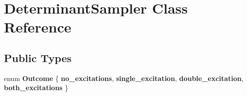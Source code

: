 \hypertarget{classDeterminantSampler}{}\section{Determinant\+Sampler Class Reference}
\label{classDeterminantSampler}
\subsection*{Public Types}
\begin{DoxyCompactItemize}
\item 
enum {\bfseries Outcome} \{ {\bfseries no\+\_\+excitations}, 
{\bfseries single\+\_\+excitation}, 
{\bfseries double\+\_\+excitation}, 
{\bfseries both\+\_\+excitations}
 \}\hypertarget{classDeterminantSampler_ae5a3525e6db38b07812ae2eea419fb3d}{}\label{classDeterminantSampler_ae5a3525e6db38b07812ae2eea419fb3d}

\end{DoxyCompactItemize}
